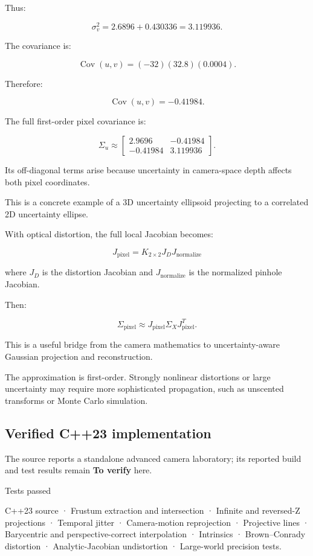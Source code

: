 Thus:

\[
 \sigma_v^2= 2.6896+0.430336 =\boxed{3.119936}.
\]

The covariance is:

\[
 \operatorname{Cov}(u,v) = (-32)(32.8)(0.0004).
\]

Therefore:

\[
 \boxed{ \operatorname{Cov}(u,v)=-0.41984 }.
\]

The full first-order pixel covariance is:

\[
 \boxed{ \Sigma_u\approx \begin{bmatrix} 2.9696&-0.41984\\ -0.41984&3.119936 \end{bmatrix} }.
\]

Its off-diagonal terms arise because uncertainty in camera-space depth affects both pixel coordinates.

This is a concrete example of a 3D uncertainty ellipsoid projecting to a correlated 2D uncertainty ellipse.

With optical distortion, the full local Jacobian becomes:

\[
 \boxed{ J_{\mathrm{pixel}} = K_{2\times2}J_DJ_{\mathrm{normalize}} }
\]

where \(J_D\) is the distortion Jacobian and \(J_{\mathrm{normalize}}\) is the normalized pinhole Jacobian.

Then:

\[
 \boxed{ \Sigma_{\mathrm{pixel}} \approx J_{\mathrm{pixel}} \Sigma_X J_{\mathrm{pixel}}^T }.
\]

This is a useful bridge from the camera mathematics to uncertainty-aware Gaussian projection and reconstruction.

The approximation is first-order. Strongly nonlinear distortions or large uncertainty may require more sophisticated propagation, such as unscented transforms or Monte Carlo simulation.

\subsection{Verified C++23 implementation}\label{02-foundations-ii-ch037-verified-c23-implementation}

The source reports a standalone advanced camera laboratory; its reported build and test results remain \textbf{To verify} here.

Tests passed

C++23 source · Frustum extraction and intersection · Infinite and reversed-Z projections · Temporal jitter · Camera-motion reprojection · Projective lines · Barycentric and perspective-correct interpolation · Intrinsics · Brown--Conrady distortion · Analytic-Jacobian undistortion · Large-world precision tests.

